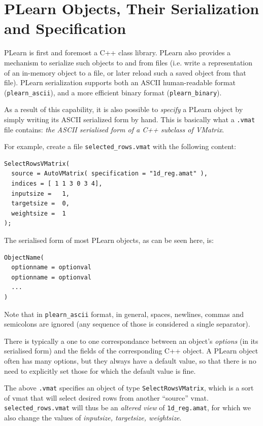 \documentclass[11pt]{book}
\begin{document}
\section{PLearn Objects, Their Serialization and Specification}

PLearn is first and foremost a C++ class library. PLearn also provides a
mechanism to serialize such objects to and from files (i.e. write a
representation of an in-memory object to a file, or later reload such a
saved object from that file). PLearn serialization supports both an ASCII
human-readable format (\verb!plearn_ascii!), and a more efficient binary format (\verb!plearn_binary!).

As a result of this capability, it is also possible to {\em specify} a
PLearn object by simply writing its ASCII serialized form by hand. 
This is basically what a {\tt .vmat} file contains: {\em the ASCII serialised form of a C++ subclass of VMatrix}.

For example, create a file \verb!selected_rows.vmat! with the following content:

\begin{verbatim}
SelectRowsVMatrix(
  source = AutoVMatrix( specification = "1d_reg.amat" ),
  indices = [ 1 1 3 0 3 4],
  inputsize =   1,
  targetsize =  0,
  weightsize =  1
);
\end{verbatim}

The serialised form of most PLearn objects, as can be seen here, is:
\begin{verbatim}
ObjectName(  
  optionname = optionval
  optionname = optionval
  ...
)
\end{verbatim}

Note that in \verb!plearn_ascii! format, in general, spaces, newlines, commas and semicolons
are ignored (any sequence of those is considered a single separator).

There is typically a one to one correspondance between an object's {\em
  options} (in its serialised form) and the fields of the corresponding C++
object. A PLearn object often has many options, but they always have a default value,
so that there is no need to explicitly set those for which the default value is fine.

The above {\tt .vmat} specifies an object of type {\tt SelectRowsVMatrix},
which is a sort of vmat that will select desired rows from another
``source'' vmat.  \verb!selected_rows.vmat! will thus be an {\em altered
  view} of \verb!1d_reg.amat!, for which we also change the values of {\em
  inputsize, targetsize, weightsize}.
\end{document}
